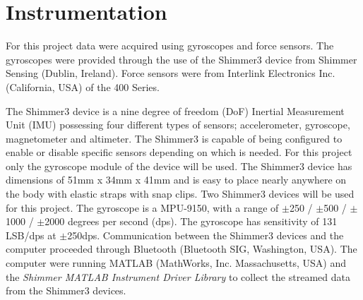 \section{Instrumentation} \label{methods:instrumentation}

For this project data were acquired using gyroscopes and force sensors. The gyroscopes were provided through the use of the Shimmer3 device from Shimmer Sensing (Dublin, Ireland). Force sensors were from Interlink Electronics Inc. (California, USA) of the 400 Series. %

The Shimmer3 device is a nine degree of freedom (DoF) Inertial Measurement Unit (IMU) possessing four different types of sensors; accelerometer, gyroscope, magnetometer and altimeter. The Shimmer3 is capable of being configured to enable or disable specific sensors depending on which is needed. For this project only the gyroscope module of the device will be used. The Shimmer3 device has dimensions of 51mm x 34mm x 41mm and is easy to place nearly anywhere on the body with elastic straps with snap clips. Two Shimmer3 devices will be used for this project. %
The gyroscope is a MPU-9150, with a range of $\pm$250 / $\pm$500 / $\pm$1000 / $\pm$2000 degrees per second (dps). The gyroscope has sensitivity of 131 LSB/dps at $\pm$250dps. \cite{ShimmerSensing2016}
Communication between the Shimmer3 devices and the computer proceeded through Bluetooth (Bluetooth SIG, Washington, USA). The computer were running MATLAB (MathWorks, Inc. Massachusetts, USA) and the \textit{Shimmer MATLAB Instrument Driver Library} to collect the streamed data from the Shimmer3 devices.



